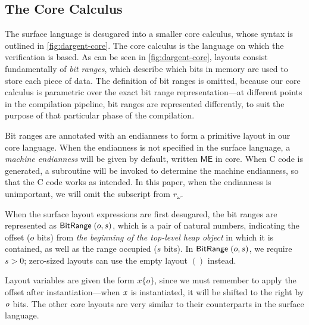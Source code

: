 \subsection{The \Dargent Core Calculus}\label{ss:dargent-core}




The \Dargent surface language is desugared into a smaller core calculus,
whose syntax is outlined in \autoref{fig:dargent-core}. The core calculus is
the language on which the verification is based. As can be seen in  \autoref{fig:dargent-core}, layouts consist fundamentally of \emph{bit ranges}, which describe which bits in memory are used
to store each piece of data. The definition of bit ranges is omitted, because our core calculus is parametric over the exact bit range
representation---at different points in the compilation pipeline, bit ranges are represented
differently, to suit the purpose of that particular phase of the compilation.

Bit ranges are annotated with an endianness to form a primitive layout in our 
core language. When the endianness is not specified in the surface language, 
a \emph{machine endianness} will be given by default, written $\mathsf{ME}$
 in core. When C code is generated, a
subroutine will be invoked to determine the machine endianness, so that the C code works
as intended.
%
In this paper, when the endianness is unimportant, we will omit the
subscript from $r_{\omega}$.

When the surface layout expressions are first desugared, the bit ranges are represented
as $\mathsf{BitRange}\;(o, s)$, which is a pair of natural numbers, indicating the offset ($o$ bits) from
\emph{the beginning of the top-level heap object} in which it is contained, 
as well as the range occupied ($s$ bits).
%
In $\mathsf{BitRange}\;(o, s)$, we require $s > 0$; zero-sized layouts can use the
empty layout $()$ instead.

Layout variables are given the form $x\{o\}$, since we must remember to
apply the offset after instantiation---when $\mathit{x}$
is instantiated, it will be shifted to the right by $\mathit{o}$ bits.
The other core layouts are very similar to their counterparts in the
surface language.

